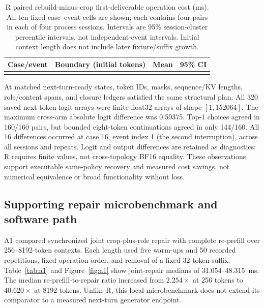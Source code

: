 \begin{table}[t]
\centering\small
\caption{R paired rebuild-minus-crop first-deliverable operation cost (ms). All ten fixed case--event cells are shown; each contains four pairs in each of four process sessions. Intervals are 95\% session-cluster percentile intervals, not independent-event intervals. Initial context length does not include later fixture/suffix growth.}
\label{tab:r}
\begin{tabularx}{\linewidth}{@{}lYr r@{}}
\toprule
Case/event & Boundary (initial tokens) & Mean & 95\% CI \\
\midrule
{}
\bottomrule
\end{tabularx}
\end{table}

At matched next-turn-ready states, token IDs, masks, sequence/KV lengths, role/content spans, and closure ledgers satisfied the same structural plan. All 320 saved next-token logit arrays were finite float32 arrays of shape $[1,152064]$. The maximum cross-arm absolute logit difference was 0.59375. Top-1 choices agreed in 160/160 pairs, but bounded eight-token continuations agreed in only 144/160. All 16 differences occurred at case 16, event index 1 (the second interruption), across all sessions and repeats. Logit and output differences are retained as diagnostics: R requires finite values, not cross-topology BF16 equality. These observations support executable same-policy recovery and measured cost savings, not numerical equivalence or broad functionality without loss.

\subsection{Supporting repair microbenchmark and software path}

A1 compared synchronized joint crop-plus-role repair with complete re-prefill over 256--8192-token contexts. Each length used five warm-ups and 50 recorded repetitions, fixed operation order, and removal of a fixed 32-token suffix. Table~\ref{tab:a1} and Figure~\ref{fig:a1} show joint-repair medians of 31.054--48.315~ms. The median re-prefill-to-repair ratio increased from $2.254\times$ at 256 tokens to $40.620\times$ at 8192 tokens. Unlike R, this local microbenchmark does not extend its comparator to a measured next-turn generator endpoint.

